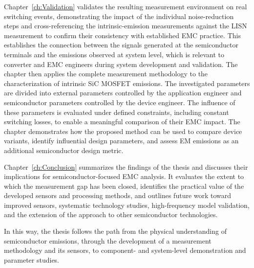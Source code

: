 Chapter~\ref{ch:Validation} validates the resulting measurement environment on real switching events, demonstrating the impact of the individual noise-reduction steps and cross-referencing the intrinsic-emission measurements against the LISN measurement to confirm their consistency with established EMC practice.
This establishes the connection between the signals generated at the semiconductor terminals and the emissions observed at system level, which is relevant to converter and EMC engineers during system development and validation.
The chapter then applies the complete measurement methodology to the characterization of intrinsic SiC MOSFET emissions. 
The investigated parameters are divided into external parameters controlled by the application engineer and semiconductor parameters controlled by the device engineer. 
The influence of these parameters is evaluated under defined constraints, including constant switching losses, to enable a meaningful comparison of their EMC impact. 
The chapter demonstrates how the proposed method can be used to compare device variants, identify influential design parameters, and assess EM emissions as an additional semiconductor design metric.

Chapter~\ref{ch:Conclusion} summarizes the findings of the thesis and discusses their implications for semiconductor-focused EMC analysis. It evaluates the extent to which the measurement gap has been closed, identifies the practical value of the developed sensors and processing methods, and outlines future work toward improved sensors, systematic technology studies, high-frequency model validation, and the extension of the approach to other semiconductor technologies.

In this way, the thesis follows the path from the physical understanding of semiconductor emissions, through the development of a measurement methodology and its sensors, to component- and system-level demonstration and parameter studies. 


